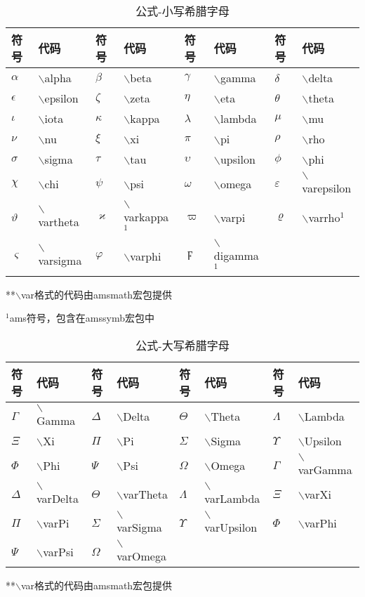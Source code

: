 \documentclass[UTF8,fontset=ubuntu]{ctexart}
\begin{document}
\begin{table}
\begin{tabular}{l l l l l l l l}
	\hline
	符号 & 代码 & 符号 & 代码 & 符号 & 代码 & 符号 & 代码\\
	\hline
	$\alpha$ & $\backslash$alpha & $\beta$ & $\backslash$beta & $\gamma$ & $\backslash$gamma & $\delta$ & $\backslash$delta\\
	$\epsilon$ & $\backslash$epsilon & $\zeta$ & $\backslash$zeta & $\eta$ & $\backslash$eta & $\theta$ & $\backslash$theta\\
	$\iota$ & $\backslash$iota & $\kappa$ & $\backslash$kappa & $\lambda$ & $\backslash$lambda & $\mu$ & $\backslash$mu\\
	$\nu$ & $\backslash$nu & $\xi$ & $\backslash$xi & $\pi$ & $\backslash$pi & $\rho$ & $\backslash$rho\\
	$\sigma$ & $\backslash$sigma & $\tau$ & $\backslash$tau & $\upsilon$ & $\backslash$upsilon & $\phi$ & $\backslash$phi\\
	$\chi$ & $\backslash$chi & $\psi$ & $\backslash$psi & $\omega$ & $\backslash$omega & $\varepsilon$ & $\backslash$varepsilon\\
	$\vartheta$ & $\backslash$vartheta & $\varkappa$ & $\backslash$varkappa${}^1$ & $\varpi$ & $\backslash$varpi & $\varrho$ & $\backslash$varrho${}^1$\\
	$\varsigma$ & $\backslash$varsigma & $\varphi$ & $\backslash$varphi & $\digamma$ & $\backslash$digamma${}^1$\\
	\hline
\end{tabular}
**$\backslash$var格式的代码由amsmath宏包提供\par
${}^1$\hspace{1mm}ams符号，包含在amssymb宏包中
\caption{公式-小写希腊字母}
\end{table}
\begin{table}
\begin{tabular}{l l l l l l l l}
	\hline
	符号 & 代码 & 符号 & 代码 & 符号 & 代码 & 符号 & 代码\\
	\hline
	$\Gamma$ & $\backslash$Gamma & $\Delta$ & $\backslash$Delta & $\Theta$ & $\backslash$Theta & $\Lambda$ & $\backslash$Lambda\\
	$\Xi$ & $\backslash$Xi & $\Pi$ & $\backslash$Pi & $\Sigma$ & $\backslash$Sigma & $\Upsilon$ & $\backslash$Upsilon\\
	$\Phi$ & $\backslash$Phi & $\Psi$ & $\backslash$Psi & $\Omega$ & $\backslash$Omega & $\varGamma$ & $\backslash$varGamma\\
	$\varDelta$ & $\backslash$varDelta & $\varTheta$ & $\backslash$varTheta & $\varLambda$ & $\backslash$varLambda & $\varXi$ & $\backslash$varXi\\
	$\varPi$ & $\backslash$varPi & $\varSigma$ & $\backslash$varSigma & $\varUpsilon$ & $\backslash$varUpsilon & $\varPhi$ & $\backslash$varPhi\\
	$\varPsi$ & $\backslash$varPsi & $\varOmega$ & $\backslash$varOmega\\
	\hline
\end{tabular}
**$\backslash$var格式的代码由amsmath宏包提供
\caption{公式-大写希腊字母}
\end{table}
\end{document}

